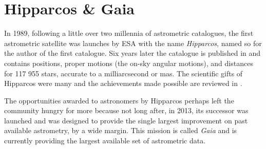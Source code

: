 \section{Hipparcos \& Gaia}\label{sec:gaia}
In 1989, following a little over two millennia of astrometric catalogues, the first astrometric satellite was launches by ESA with the name \textit{Hipparcos}, named so for the author of the first catalogue. Six years later the catalogue is published in \cite{perryman:97} and contains positions, proper motions (the on-sky angular motions), and distances for 117 955 stars, accurate to a milliarcsecond or mas. The scientific gifts of Hipparcos were many and the achievements made possible are reviewed in \cite{perryman:09}. 

The opportunities awarded to astronomers by Hipparcos perhaps left the community hungry for more because not long after, in 2013, its successor was launched and was designed to provide the single largest improvement on past available astrometry, by a wide margin. This mission is called \textit{Gaia} \citep{gaia} and is currently providing the largest available set of astrometric data. 

